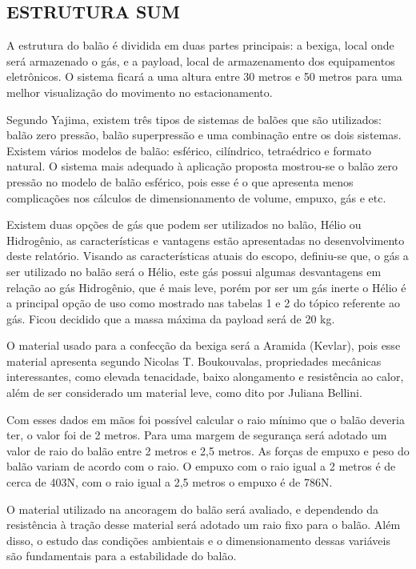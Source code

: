 \subsection{ESTRUTURA SUM}

    A estrutura do balão é dividida em duas partes principais: a bexiga, local onde será armazenado o gás, e a payload, local de armazenamento dos equipamentos eletrônicos. O sistema ficará a uma altura entre 30 metros e 50 metros para uma melhor visualização do movimento no estacionamento.

    Segundo Yajima, existem três tipos de sistemas de balões que são utilizados: balão zero pressão, balão super­pressão e uma combinação entre os dois sistemas. Existem vários modelos de balão: esférico, cilíndrico, tetraédrico e formato natural. O sistema mais adequado à aplicação proposta mostrou-se o balão zero pressão no modelo de balão esférico, pois esse é o que apresenta menos complicações nos cálculos de dimensionamento de volume, empuxo, gás e etc.

    Existem duas opções de gás que podem ser utilizados no balão, Hélio ou Hidrogênio, as características e vantagens estão apresentadas no desenvolvimento deste relatório. Visando as características atuais do escopo, definiu-se que, o gás a ser utilizado no balão será o Hélio, este gás possui algumas desvantagens em relação ao gás Hidrogênio, que é mais leve, porém por ser um gás inerte o Hélio é a principal opção de uso como mostrado nas tabelas 1 e 2 do tópico referente ao gás. Ficou decidido que a massa máxima da payload será de 20 kg.

    O material usado para a confecção da bexiga será a Aramida (Kevlar), pois esse material apresenta segundo Nicolas T. Boukouvalas, propriedades mecânicas interessantes, como elevada tenacidade, baixo alongamento e resistência ao calor, além de ser considerado um material leve, como dito por Juliana Bellini.
  
    Com esses dados em mãos foi possível calcular o raio mínimo que o balão deveria ter, o valor foi de 2 metros. Para uma margem de segurança será adotado um valor de raio do balão entre 2 metros e 2,5 metros. As forças de empuxo e peso do balão variam de acordo com o raio. O empuxo com o raio igual a 2 metros é de cerca de 403N, com o raio igual a 2,5 metros o empuxo é de 786N.
  
    O material utilizado na ancoragem do balão será avaliado, e dependendo da resistência à tração desse material será adotado um raio fixo para o balão. Além disso, o estudo das condições ambientais e o dimensionamento dessas variáveis são fundamentais para a estabilidade do balão.

